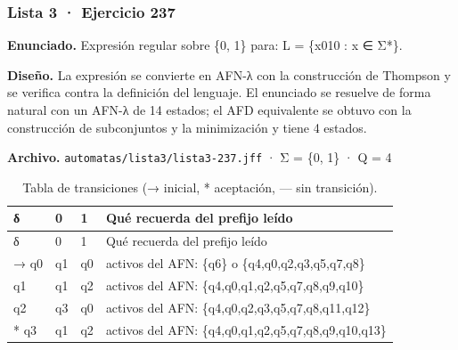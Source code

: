 
\hypertarget{lista-3-ejercicio-237}{%
\subsubsection{Lista 3 · Ejercicio 237}\label{lista-3-ejercicio-237}}

\textbf{Enunciado.} Expresión regular sobre \{0, 1\} para: L = \{x010 : x ∈ Σ*\}.

\textbf{Diseño.} La expresión se convierte en AFN-λ con la construcción de Thompson y se verifica contra la definición del lenguaje. El enunciado se resuelve de forma natural con un AFN-λ de 14 estados; el AFD equivalente se obtuvo con la construcción de subconjuntos y la minimización y tiene 4 estados.

\textbf{Archivo.} \texttt{automatas/lista3/lista3-237.jff} · Σ = \{0, 1\} · \textbar Q\textbar{} = 4

\begin{longtable}[]{@{}llll@{}}
\caption{Tabla de transiciones (→ inicial, * aceptación, --- sin transición).}\tabularnewline
\toprule\noalign{}
δ & 0 & 1 & Qué recuerda del prefijo leído \\
\midrule\noalign{}
\endfirsthead
\toprule\noalign{}
δ & 0 & 1 & Qué recuerda del prefijo leído \\
\midrule\noalign{}
\endhead
\bottomrule\noalign{}
\endlastfoot
→ q0 & q1 & q0 & activos del AFN: \{q6\} o \{q4,q0,q2,q3,q5,q7,q8\} \\
q1 & q1 & q2 & activos del AFN: \{q4,q0,q1,q2,q5,q7,q8,q9,q10\} \\
q2 & q3 & q0 & activos del AFN: \{q4,q0,q2,q3,q5,q7,q8,q11,q12\} \\
* q3 & q1 & q2 & activos del AFN: \{q4,q0,q1,q2,q5,q7,q8,q9,q10,q13\} \\
\end{longtable}

